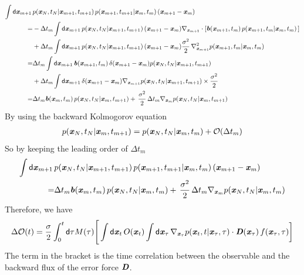 \documentclass[aip,jcp,a4paper,reprint,onecolumn]{revtex4-1}
\newcommand{\redc}[1]{{\color{red} #1}}
\newcommand{\vect}[1]{\textbf{\textit{#1}}}
\newcommand{\dd}{\textsf{d}}
\newcommand{\mo}{\mathcal O}
\begin{document}
\begin{align}\nonumber
  \int\dd \vect x_{m+1}\,
  &
  p(\vect x_N,t_N | \vect x_{m+1}, t_{m+1})\,
  p(\vect x_{m+1}, t_{m+1} | \vect x_{m}, t_{m})\,
  (\vect x_{m+1} -\vect x_{m})\\\nonumber
  =&
  -
  \Delta t_m
  \int \dd \vect x_{m+1}\,
  p(\vect x_N,t_N | \vect x_{m+1}, t_{m+1})\,
  (\vect x_{m+1} - \vect x_{m})
  \nabla_{\vect x_{m+1}}
  \cdot
  [ \vect b(\vect x_{m+1}, t_m)\,
  p(\vect x_{m+1},t_{m} | \vect x_{m},t_{m} )\,]\\\nonumber
  &
  +
  \Delta t_m
  \int \dd \vect x_{m+1}\,
  p(\vect x_N,t_N | \vect x_{m+1}, t_{m+1})\,
  (\vect x_{m+1} - \vect x_{m})
  \frac{\sigma^2} 2\,
  \nabla_{\vect x_{m+1}}^2 p(\vect x_{m+1},t_{m} | \vect x_{m},t_{m} ) \\\nonumber
  =&
  \Delta t_m
  \int \dd \vect x_{m+1}\,
  \vect b(\vect x_{m+1}, t_m)\,
  \delta (\vect x_{m+1} - \vect x_{m})
  p(\vect x_N,t_N | \vect x_{m+1}, t_{m+1}) \\\nonumber
  &+
  \Delta t_m
  \int \dd \vect x_{m+1}\,
  \delta (\vect x_{m+1} - \vect x_{m})
  \nabla_{\vect x_{m+1}}p(\vect x_N,t_N | \vect x_{m+1}, t_{m+1})\times
  \frac{\sigma^2} 2 \\
  =&
  \Delta t_m
  \vect b(\vect x_{m}, t_m)\,
  p(\vect x_N,t_N | \vect x_{m}, t_{m+1}) 
  +
  \,\frac{\sigma^2} 2\,\Delta t_m
  \nabla_{\vect x_{m}}p(\vect x_N,t_N | \vect x_{m}, t_{m+1})
\end{align}
By using the backward Kolmogorov equation
\begin{align}
  p(\vect x_N,t_N | \vect x_{m}, t_{m+1})
  = 
  p(\vect x_N,t_N | \vect x_{m}, t_{m})
  + \mathcal O(\Delta t_m)
\end{align}
So by keeping the leading order of $\Delta t_m$
\begin{align}\nonumber
  \int\dd \vect x_{m+1}\,
  &
  p(\vect x_N,t_N | \vect x_{m+1}, t_{m+1})\,
  p(\vect x_{m+1}, t_{m+1} | \vect x_{m}, t_{m})\,
  (\vect x_{m+1} -\vect x_{m})\\\nonumber
  =&
  \Delta t_m
  \vect b(\vect x_{m}, t_m)\,
  p(\vect x_N,t_N | \vect x_{m}, t_{m}) 
  +
  \,\frac{\sigma^2} 2\,\Delta t_m
  \nabla_{\vect x_{m}}p(\vect x_N,t_N | \vect x_{m}, t_{m})
\end{align}
Therefore, we have
\begin{align}\label{eqn:error-o-corr}
  \Delta\mo (t) =
  \frac\sigma 2
  \int_0^t \dd\tau M(\tau)
  \Bigg[
  \int \dd\vect x_t\, O(\vect x_t)
  \int \dd\vect x_\tau\,
  \nabla_{\vect x_{\tau}}p(\vect x_t,t | \vect x_{\tau}, \tau)
  \cdot
  \vect D(\vect x_\tau)\,
  f(\vect x_\tau,\tau)
  \bigg]
\end{align}
\redc{
The term in the bracket is the time correlation between
the observable and the backward flux of the error force $\vect D$.
}
\end{document}
